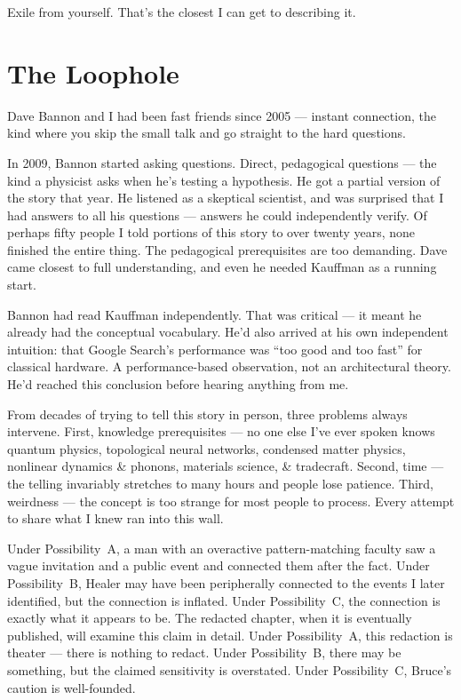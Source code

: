 Exile from yourself. That's the closest I can get to describing it.

\section*{The Loophole}
\label{pos29:the-loophole}

Dave Bannon and I had been fast friends since 2005 --- instant connection, the kind where you skip the small talk and go straight to the hard questions.

In 2009, Bannon started asking questions. Direct, pedagogical questions --- the kind a physicist asks when he's testing a hypothesis. He got a partial version of the story that year. He listened as a skeptical scientist, and was surprised that I had answers to all his questions --- answers he could independently verify. Of perhaps fifty people I told portions of this story to over twenty years, none finished the entire thing. The pedagogical prerequisites are too demanding. Dave came closest to full understanding, and even he needed Kauffman as a running start.

Bannon had read Kauffman independently. That was critical --- it meant he already had the conceptual vocabulary. He'd also arrived at his own independent intuition: that Google Search's performance was ``too good and too fast'' for classical hardware. A performance-based observation, not an architectural theory. He'd reached this conclusion before hearing anything from me.


From decades of trying to tell this story in person, three problems always intervene. First, knowledge prerequisites --- no one else I've ever spoken knows quantum physics, topological neural networks, condensed matter physics, nonlinear dynamics \& phonons, materials science, \& tradecraft. Second, time --- the telling invariably stretches to many hours and people lose patience. Third, weirdness --- the concept is too strange for most people to process. Every attempt to share what I knew ran into this wall.

Under Possibility~A, a man with an overactive pattern-matching faculty saw a vague invitation and a public event and connected them after the fact. Under Possibility~B, Healer may have been peripherally connected to the events I later identified, but the connection is inflated. Under Possibility~C, the connection is exactly what it appears to be. The redacted chapter, when it is eventually published, will examine this claim in detail. Under Possibility~A, this redaction is theater --- there is nothing to redact. Under Possibility~B, there may be something, but the claimed sensitivity is overstated. Under Possibility~C, Bruce's caution is well-founded.

